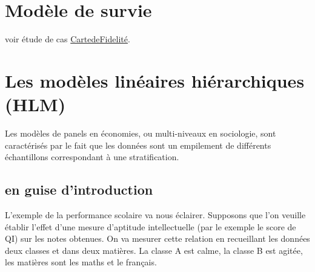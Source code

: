 \documentclass[
]{book}
\begin{document}
\hypertarget{moduxe8le-de-survie}{%
\chapter{Modèle de survie}\label{moduxe8le-de-survie}}

voir étude de cas \href{https://github.com/BenaventC/survival}{CartedeFidelité}.

\hypertarget{les-moduxe8les-linuxe9aires-hiuxe9rarchiques-hlm}{%
\chapter{Les modèles linéaires hiérarchiques (HLM)}\label{les-moduxe8les-linuxe9aires-hiuxe9rarchiques-hlm}}

Les modèles de panels en économies, ou multi-niveaux en sociologie, sont caractérisés par le fait que les données sont un empilement de différents échantillons correspondant à une stratification.

\hypertarget{en-guise-dintroduction}{%
\section{en guise d'introduction}\label{en-guise-dintroduction}}

L'exemple de la performance scolaire va nous éclairer. Supposons que l'on veuille établir l'effet d'une mesure d'aptitude intellectuelle (par le exemple le score de QI) sur les notes obtenues. On va mesurer cette relation en recueillant les données deux classes et dans deux matières. La classe A est calme, la classe B est agitée, les matières sont les maths et le français.
\end{document}
